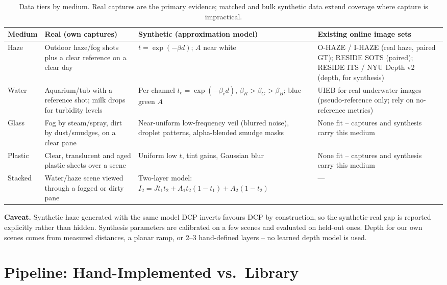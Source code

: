 \documentclass[12pt,a4paper]{article}
\begin{document}
\begin{table}[H]
\centering
\normalsize
\begin{tabular}{@{}lp{3.6cm}p{3.9cm}p{4.3cm}@{}}
\toprule
Medium & Real (own captures) & Synthetic (approximation model) & Existing online image sets \\
\midrule
Haze & Outdoor haze/fog shots plus a clear reference on a clear day &
  $t=\exp(-\beta d)$; $A$ near white &
  O-HAZE / I-HAZE (real haze, paired GT); RESIDE SOTS (paired); RESIDE
  ITS / NYU Depth v2 (depth, for synthesis) \\
Water & Aquarium/tub with a reference shot; milk drops for turbidity
  levels &
  Per-channel $t_c=\exp(-\beta_c d)$, $\beta_R>\beta_G>\beta_B$;
  blue-green $A$ &
  UIEB for real underwater images (pseudo-reference only; rely on
  no-reference metrics) \\
Glass & Fog by steam/spray, dirt by dust/smudges, on a clear pane &
  Near-uniform low-frequency veil (blurred noise), droplet patterns,
  alpha-blended smudge masks &
  None fit -- captures and synthesis carry this medium \\
Plastic & Clear, translucent and aged plastic sheets over a scene &
  Uniform low $t$, tint gains, Gaussian blur &
  None fit -- captures and synthesis carry this medium \\
Stacked & Water/haze scene viewed through a fogged or dirty pane &
  Two-layer model: $I_2 = J t_1 t_2 + A_1 t_2(1-t_1) + A_2(1-t_2)$ &
  --- \\
\bottomrule
\end{tabular}
\caption{Data tiers by medium. Real captures are the primary evidence;
matched and bulk synthetic data extend coverage where capture is
impractical.}
\label{tab:data}
\end{table}

\textbf{Caveat.} Synthetic haze generated with the same model DCP
inverts favours DCP by construction, so the synthetic-real gap is
reported explicitly rather than hidden. Synthesis parameters are
calibrated on a few scenes and evaluated on held-out ones. Depth for our
own scenes comes from measured distances, a planar ramp, or 2--3
hand-defined layers -- no learned depth model is used.

\section{Pipeline: Hand-Implemented vs.\ Library}
\label{sec:pipeline}
\end{document}

